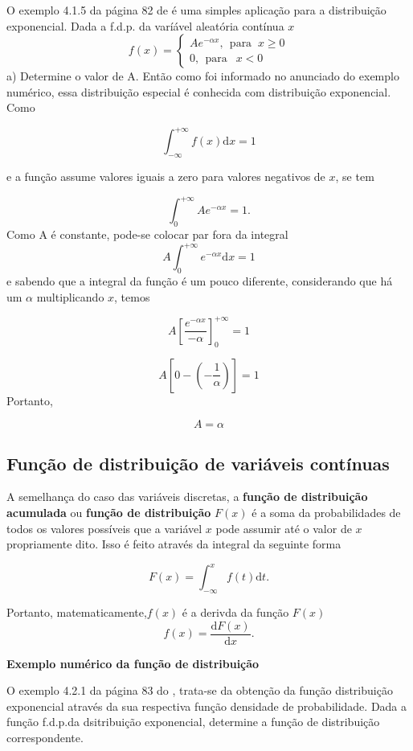 \documentclass[
]{book}
\begin{document}
O exemplo 4.1.5 da página 82 de \citet{Sartoris2013} é uma simples aplicação para a distribuição exponencial. Dada a f.d.p. da varíável aleatória contínua \(x\)
\[
  f(x) =
    \begin{cases}
      Ae^{-\alpha x},~~\text{para }~x\geq 0 \\
      0,~~\text{para }~~x<0
    \end{cases}
\]
a) Determine o valor de A.
Então como foi informado no anunciado do exemplo numérico, essa distribuição especial é conhecida com distribuição exponencial. Como

\[
  \int_{-\infty}^{+\infty} f(x) \text{d}x = 1
\]

e a função assume valores iguais a zero para valores negativos de \(x\), se tem

\[
  \int_ {0}^{+\infty} A e^{-\alpha x} = 1.
\]
Como A é constante, pode-se colocar par fora da integral
\[
  A\int_{0}^{+\infty} e^{-\alpha x}\text{d}x = 1
\]
e sabendo que a integral da função é um pouco diferente, considerando que há um \(\alpha\) multiplicando \(x\), temos

\[
  A\left[ \dfrac{e^{-\alpha x}}{-\alpha} \right]_{0}^{+\infty} = 1
\]

\[
  A\left[0  - \left(-\dfrac{1}{\alpha}\right)\right] = 1
\]
Portanto,

\[
A = \alpha
\]

\hypertarget{funuxe7uxe3o-de-distribuiuxe7uxe3o-de-variuxe1veis-contuxednuas}{%
\subsection{Função de distribuição de variáveis contínuas}\label{funuxe7uxe3o-de-distribuiuxe7uxe3o-de-variuxe1veis-contuxednuas}}

A semelhança do caso das variáveis discretas, a \textbf{função de distribuição acumulada } ou \textbf{função de distribuição} \(F(x)\) é a soma da probabilidades de todos os valores possíveis que a variável \(x\) pode assumir até o valor de \(x\) propriamente dito. Isso é feito através da integral da seguinte forma

\[
  F(x) = \int_{-\infty}^{x} f(t) \text{d}t.
\]

Portanto, matematicamente,\(f(x)\) é a derivda da função \(F(x)\)
\[
  f(x) = \dfrac{\text{d}F(x)}{\text{d}x}.
\]

\textbf{Exemplo numérico da função de distribuição}

O exemplo 4.2.1 da página 83 do \citet{Sartoris2013}, trata-se da obtenção da função distribuição exponencial através da sua respectiva função densidade de probabilidade. Dada a função f.d.p.da dsitribuição exponencial, determine a função de distribuição correspondente.
\end{document}
